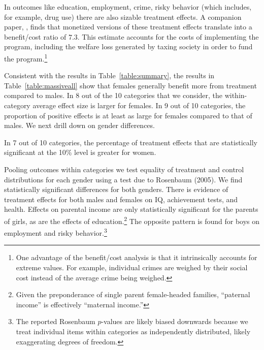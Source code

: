 In outcomes like education, employment, crime, risky behavior (which includes, for example, drug use) there are also sizable treatment effects. A companion paper, \citet{Garcia_Heckman_Leaf_etal_2017_Comp_CBA_Unpublished}, finds that monetized versions of these treatment effects translate into a benefit/cost ratio of $7.3$. This estimate accounts for the costs of implementing the program, including the welfare loss generated by taxing society in order to fund the program.\footnote{One advantage of the benefit/cost analysis is that it intrinsically accounts for extreme values. For example, individual crimes are weighed by their social cost instead of the average crime being weighed.}

Consistent with the results in Table~\ref{table:summary}, the results in Table~\ref{table:massiveall} show that females generally benefit more from treatment compared to males. In 8 out of the 10 categories that we consider, the within-category average effect size is larger for females. In 9 out of 10 categories, the proportion of positive effects is at least as large for females compared to that of males. We next drill down on gender differences.

In 7 out of 10 categories, the percentage of treatment effects that are statistically significant at the 10\% level is greater for women.

Pooling outcomes within categories we test equality of treatment and control distributions for each gender using a test due to Rosenbaum (2005). We find statistically significant differences for both genders. There is evidence of treatment effects for both males and females on IQ, achievement tests, and health. Effects on parental income are only statistically significant for the parents of girls, as are the effects of education.\footnote{Given the preponderance of single parent female-headed families, ``paternal income'' is effectively ``maternal income.''} The opposite pattern is found for boys on employment and risky behavior.\footnote{The reported Rosenbaum $p$-values are likely biased downwards because we treat individual items within categories as independently distributed, likely exaggerating degrees of freedom.}


